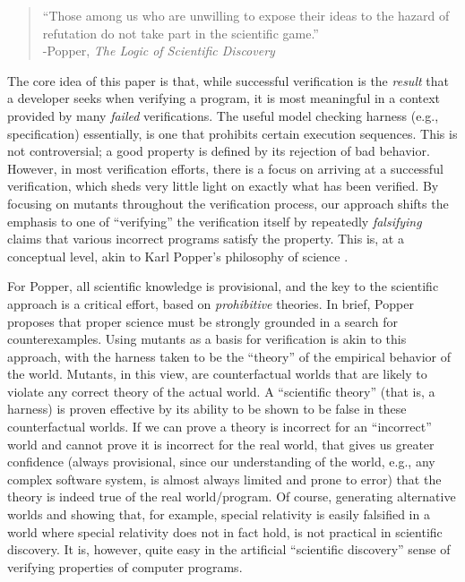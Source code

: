\documentclass{svjour3}
\begin{document}
\begin{quote}
``Those among us who are unwilling to expose their ideas to the hazard 
of refutation do not take part in the scientific game.''\\
-Popper, \emph{The Logic of Scientific Discovery} \cite{Popper}
\end{quote}



The core idea of this paper is that, while successful verification is
the \emph{result} that a developer seeks when verifying a program, it
is most meaningful in a context provided by many \emph{failed} verifications.
The useful model checking harness (e.g., specification) essentially,
is one that prohibits certain execution sequences.  This is not
controversial; a good property is defined by its rejection of bad
behavior.  However, in most verification efforts, there is a focus on
arriving at a successful verification, which sheds very little light
on exactly what has been verified.  By focusing on mutants throughout the
verification process, our approach shifts the emphasis to one of
``verifying'' the verification itself by repeatedly \emph{falsifying}
claims that various incorrect programs satisfy the property.  This is,
at a conceptual level, akin to Karl Popper's philosophy of science
\cite{Popper,popperconjectures}.

For Popper, all scientific knowledge is provisional, and the key to
the scientific approach is a critical effort, based on
\emph{prohibitive} theories.  In brief, Popper proposes that proper
science must be strongly grounded in a search for counterexamples.
Using mutants as a basis for verification is akin to this approach,
with the harness taken to be the ``theory'' of the empirical behavior
of the world.  Mutants, in this view, are counterfactual worlds that
are likely to violate any correct theory of the actual world.  A
``scientific theory'' (that is, a harness) is proven effective by its
ability to be shown to be false in these counterfactual worlds.
If we can prove a theory is incorrect for an ``incorrect'' world and
cannot prove it is incorrect for the real world, that gives us greater
confidence (always provisional, since our understanding of the world,
e.g., any complex software system, is almost always limited and prone
to error) that the theory is indeed true of the real world/program.
Of course, generating alternative worlds and showing that, for
example, special relativity is easily falsified in a world where
special relativity does not in fact hold, is not practical in
scientific discovery.  It is, however, quite easy in the artificial
``scientific discovery'' sense of verifying properties of computer
programs.
\end{document}
